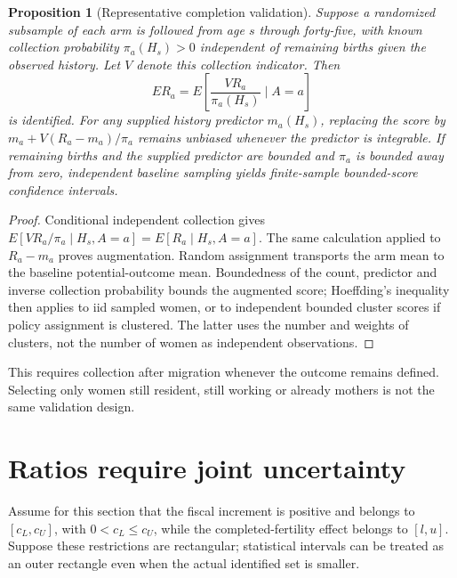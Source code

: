 \documentclass[11pt]{article}
\newtheorem{proposition}[theorem]{Proposition}
\theoremstyle{remark}
\begin{document}
\begin{proposition}[Representative completion validation]
Suppose a randomized subsample of each arm is followed from age $s$ through forty-five, with known collection probability $\pi_a(H_s)>0$ independent of remaining births given the observed history. Let $V$ denote this collection indicator. Then
\[
 ER_a=E\left[\frac{VR_a}{\pi_a(H_s)}\mid A=a\right]
\]
is identified. For any supplied history predictor $m_a(H_s)$, replacing the score by
$m_a+V(R_a-m_a)/\pi_a$ remains unbiased whenever the predictor is integrable. If remaining births and the supplied predictor are bounded and $\pi_a$ is bounded away from zero, independent baseline sampling yields finite-sample bounded-score confidence intervals.
\end{proposition}
\begin{proof}
Conditional independent collection gives
$E[VR_a/\pi_a\mid H_s,A=a]=E[R_a\mid H_s,A=a]$.
The same calculation applied to $R_a-m_a$ proves augmentation. Random assignment transports the arm mean to the baseline potential-outcome mean. Boundedness of the count, predictor and inverse collection probability bounds the augmented score; Hoeffding's inequality then applies to iid sampled women, or to independent bounded cluster scores if policy assignment is clustered. The latter uses the number and weights of clusters, not the number of women as independent observations.
\end{proof}
This requires collection after migration whenever the outcome remains defined. Selecting only women still resident, still working or already mothers is not the same validation design.

\section*{Ratios require joint uncertainty}
Assume for this section that the fiscal increment is positive and belongs to $[c_L,c_U]$, with $0<c_L\le c_U$, while the completed-fertility effect belongs to $[l,u]$. Suppose these restrictions are rectangular; statistical intervals can be treated as an outer rectangle even when the actual identified set is smaller.
\end{document}
